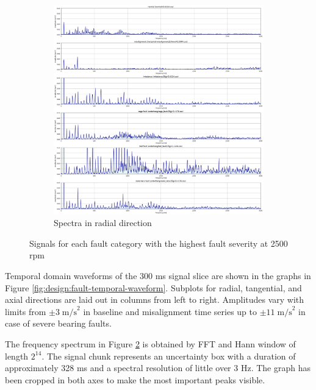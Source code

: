 \begin{figure}[ht]
\begin{subfigure}[b]{0.44\textwidth}
    \end{subfigure}
    \hfill
    \begin{subfigure}[b]{0.55\textwidth}
        \includegraphics[width=\textwidth]{assets/design/Mafaulda-A-spectrum-Y-axis.png}
        \caption{Spectra in radial direction}
        \label{fig:design:fault-spectral-waveform}
    \end{subfigure} 
    \caption{Signals for each fault category with the highest fault severity at 2500 rpm}
\end{figure}

Temporal domain waveforms of the 300 ms signal slice are shown in the graphs in Figure \ref{fig:design:fault-temporal-waveform}. Subplots for radial, tangential, and axial directions are laid out in columns from left to right. Amplitudes vary with limits from $\pm 3\; \mathrm{m/s}^2$ in baseline and misalignment time series up to $\pm 11\;\mathrm{m/s}^2$ in case of severe bearing faults. 

The frequency spectrum in Figure \ref{fig:design:fault-spectral-waveform} is obtained by FFT and Hann window of length $2^{14}$. The signal chunk represents an uncertainty box with a duration of approximately 328 ms and a spectral resolution of little over 3 Hz. The graph has been cropped in both axes to make the most important peaks visible.


